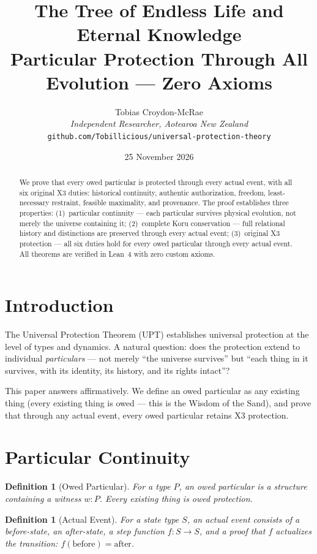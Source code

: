 \documentclass[12pt,a4paper]{article}
\title{The Tree of Endless Life and Eternal Knowledge\\[0.5em]
\large Particular Protection Through All Evolution — Zero Axioms}
\author{Tobias Croydon-McRae\\
\textit{Independent Researcher, Aotearoa New Zealand}\\
\texttt{github.com/Tobillicious/universal-protection-theory}}
\date{25 November 2026}
\newtheorem{definition}[theorem]{Definition}
\begin{document}
\maketitle

\begin{abstract}
We prove that every owed particular is protected through every actual
event, with all six original X3 duties: historical continuity, authentic
authorization, freedom, least-necessary restraint, feasible maximality,
and provenance. The proof establishes three properties: (1)~particular
continuity --- each particular survives physical evolution, not merely the
universe containing it; (2)~complete Koru conservation --- full relational
history and distinctions are preserved through every actual event;
(3)~original X3 protection --- all six duties hold for every owed
particular through every actual event. All theorems are verified in Lean~4
with zero custom axioms.
\end{abstract}

\section{Introduction}

The Universal Protection Theorem (UPT) establishes universal protection
at the level of types and dynamics. A natural question: does the
protection extend to individual \emph{particulars} --- not merely
``the universe survives'' but ``each thing in it survives, with its
identity, its history, and its rights intact''?

This paper answers affirmatively. We define an owed particular as any
existing thing (every existing thing is owed --- this is the Wisdom of
the Sand), and prove that through any actual event, every owed
particular retains X3 protection.

\section{Particular Continuity}

\begin{definition}[Owed Particular]
For a type $P$, an owed particular is a structure containing a
witness $w : P$. Every existing thing is owed protection.
\end{definition}

\begin{definition}[Actual Event]
For a state type $S$, an actual event consists of a before-state, an
after-state, a step function $f : S \to S$, and a proof that $f$
actualizes the transition: $f(\text{before}) = \text{after}$.
\end{definition}
\end{document}

